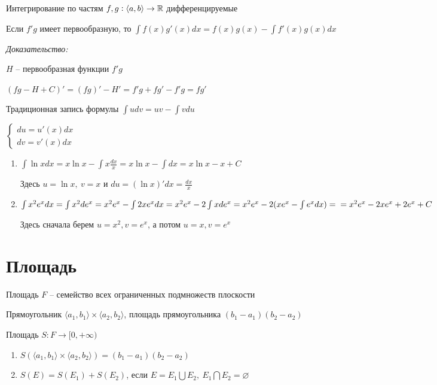 \documentclass[12pt]{article}
\newcommand{\q}[1]{\langle #1 \rangle}
\begin{document}
\begin{theo}{Интегрирование по частям}
    $f, g : \q{a, b} \rightarrow \R$ дифференцируемые

    Если $f'g$ имеет первообразную, то $\int f(x)g'(x)dx = f(x)g(x) - \int f'(x)g(x)dx$
\end{theo}

\textit{Доказательство:}

$H$ -- первообразная функции $f'g$

$(fg - H + C)' = (fg)' - H' = f'g + fg' - f'g = fg'$

\begin{nota}{Традиционная запись формулы}
    $\int udv = uv - \int vdu$

    $\begin{cases}
        du = u'(x)dx \\
        dv = v'(x)dx
    \end{cases}$
\end{nota}

\begin{Example}{}
    \begin{enumerate}
        \item $\int \ln{x}dx = x\ln{x} - \int x \frac{dx}{x} = x\ln{x} - \int dx = x\ln{x} - x + C$
        
        Здесь $u = \ln{x},\ v = x$ и $du = (\ln{x})'dx = \frac{dx}{x}$ 

        \item $\int x^2 e^x dx = \int x^2 de^x = x^2 e^x - \int 2x e^x dx = x^2 e^x - 2\int xde^x = x^2e^x - 2(xe^x - \int e^xdx) = \\ = x^2e^x - 2xe^x + 2e^x + C$
        
        Здесь сначала берем $u = x^2, v = e^x$, а потом $u = x, v = e^x$
    \end{enumerate}
\end{Example}

\section*{Площадь}

\begin{defin}{Площадь}
    $F$ -- семейство всех ограниченных подмножеств плоскости

    Прямоугольник $\q{a_1, b_1} \times \q{a_2, b_2}$, площадь прямоугольника $(b_1 - a_1)(b_2 - a_2)$

    Площадь $S : F \rightarrow [0, + \infty)$

    \begin{enumerate}
        \item $S(\q{a_1, b_1} \times \q{a_2, b_2}) = (b_1 - a_1)(b_2 - a_2)$
        \item $S(E) = S(E_1) + S(E_2)$, если $E = E_1 \bigcup E_2,\ E_1 \bigcap E_2 = \varnothing$
    \end{enumerate}
\end{defin}
\end{document}
